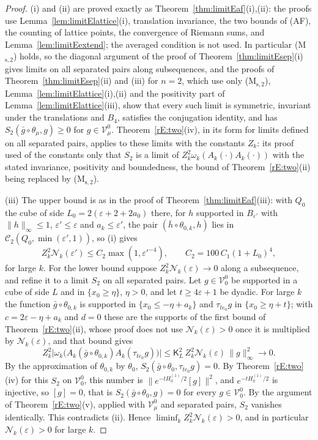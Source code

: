 \begin{proof}
(i) and (ii) are proved exactly as Theorem~\ref{thm:limitEaf}(i),(ii): the
proofs use Lemma~\ref{lem:limitElattice}(i), translation invariance, the two
bounds of (AF), the counting of lattice points, the convergence of Riemann
sums, and Lemma~\ref{lem:limitEextend}; the averaged condition is not used.
In particular (M$_{\mathrm s,2}$) holds, so the diagonal argument of the
proof of Theorem~\ref{thm:limitEsep}(i) gives limits on all separated pairs
along subsequences, and the proofs of Theorem~\ref{thm:limitEsep}(ii) and
(iii) for $n=2$, which use only (M$_{\mathrm s,2}$),
Lemma~\ref{lem:limitElattice}(i),(ii) and the positivity part of
Lemma~\ref{lem:limitElattice}(iii), show that every such limit is
symmetric, invariant under the translations and $B_4$, satisfies the
conjugation identity, and has $S_2(\bar g\circ\theta_\mu,g)\ge0$ for
$g\in\mathcal V^0_\mu$. Theorem~\ref{rE:two}(iv), in its form for limits
defined on all separated pairs, applies to these limits with the constants
$Z_k$: its proof used of the constants only that $S_2$ is a limit of
$Z_k^2\omega_k(A_k(\cdot)A_k(\cdot))$ with the stated invariance,
positivity and boundedness, the bound of Theorem~\ref{rE:two}(ii) being
replaced by (M$_{\mathrm s,2}$).

(iii) The upper bound is as in the proof of Theorem~\ref{thm:limitEaf}(iii):
with $Q_0$ the cube of side $L_0=2(\varepsilon+2+2a_0)$ there, for $h$
supported in $B_{\varepsilon'}$ with $\|h\|_\infty\le1$, $\varepsilon'\le
\varepsilon$ and $a_k\le\varepsilon'$, the pair $(\bar h\circ\theta_{0,k},h)$
lies in $\mathcal C_2(Q_0,\min(\varepsilon',1))$, so (i) gives
\[
Z_k^2\mathcal N_k(\varepsilon')\le C_2\max(1,\varepsilon'^{-4}),\qquad
C_2=100\,C_1(1+L_0)^4 ,
\tag{b}
\]
for large $k$. For the lower bound suppose $Z_k^2\mathcal N_k(\varepsilon)
\to0$ along a subsequence, and refine it to a limit $S_2$ on all separated
pairs. Let $g\in\mathcal V^0_0$ be supported in a cube of side $L$ and in
$\{x_0\ge\eta\}$, $\eta>0$, and let $t\ge4\varepsilon+1$ be dyadic. For
large $k$ the function $\bar g\circ\theta_{0,k}$ is supported in $\{x_0\le
-\eta+a_k\}$ and $\tau_{te_0}g$ in $\{x_0\ge\eta+t\}$; with $c=2\varepsilon
-\eta+a_k$ and $d=0$ these are the supports of the first bound of
Theorem~\ref{rE:two}(ii), whose proof does not use $\mathcal N_k(
\varepsilon)>0$ once it is multiplied by $\mathcal N_k(\varepsilon)$, and
that bound gives
\[
Z_k^2\bigl|\omega_k\bigl(A_k(\bar g\circ\theta_{0,k})A_k(\tau_{te_0}g)\bigr)
\bigr|\le\mathsf K_L^2\,Z_k^2\mathcal N_k(\varepsilon)\,\|g\|_\infty^2\to0 .
\]
By the approximation of $\theta_{0,k}$ by $\theta_0$, $S_2(\bar g\circ
\theta_0,\tau_{te_0}g)=0$. By Theorem~\ref{rE:two}(iv) for this $S_2$ on
$\mathcal V^0_0$, this number is $\|e^{-tH^{(1)}_0/2}[g]\|^2$, and
$e^{-tH^{(1)}_0/2}$ is injective, so $[g]=0$, that is $S_2(\bar g\circ
\theta_0,g)=0$ for every $g\in\mathcal V^0_0$. By the argument of
Theorem~\ref{rE:two}(v), applied with $\mathcal V^0_\mu$ and separated pairs,
$S_2$ vanishes identically. This contradicts (ii). Hence $\liminf_kZ_k^2
\mathcal N_k(\varepsilon)>0$, and in particular $\mathcal N_k(\varepsilon)>0$
for large $k$.


\end{proof}
